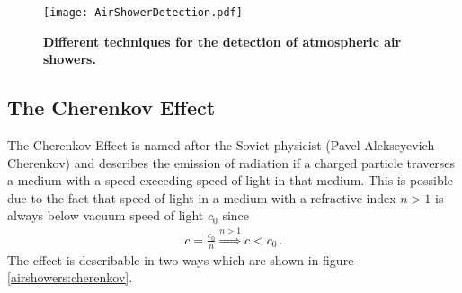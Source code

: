 \begin{figure}[h]
	\texttt{[image: AirShowerDetection.pdf]}
	\caption[Different techniques for air shower detection]{\textbf{Different techniques for the detection of atmospheric air showers.} \cite{airshowers:schroeder} }	
\end{figure}

\subsection{The Cherenkov Effect}

The Cherenkov Effect is named after the Soviet physicist \textsc(Pavel Alekseyevich Cherenkov) and describes the emission of radiation if a charged particle traverses a medium with a speed exceeding speed of light in that medium. \cite{airshowers:cherenkov} This is possible due to the fact that speed of light in a medium with a refractive index $n > 1$ is always below vacuum speed of light $c_0$ since
\begin{align}
	c = \frac{c_0}{n} \overset{n>1}{\Rightarrow} c < c_0\,.
\end{align} 
The effect is describable in two ways which are shown in figure \ref{airshowers:cherenkov}.
